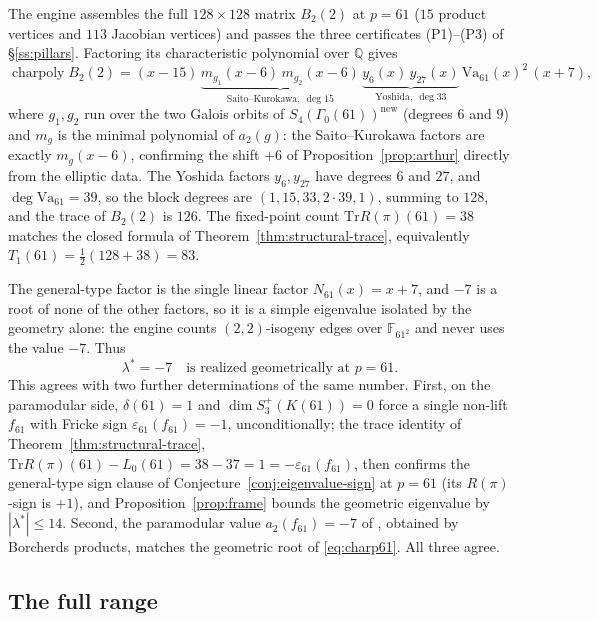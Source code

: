 \documentclass[10pt,a4paper]{amsart}
\newcommand{\Q}{\mathbb{Q}}
\newcommand{\F}{\mathbb{F}}
\newcommand{\Tr}{\mathrm{Tr}}
\newcommand{\Va}{\mathrm{Va}}
\newcommand{\eps}{\varepsilon}
\DeclareMathOperator{\charp}{charpoly}
\providecommand{\Va}{\mathrm{Va}}
\providecommand{\charp}{\operatorname{charpoly}}
\begin{document}
	The engine assembles the full $128\times128$ matrix $B_2(2)$ at $p=61$
	($15$ product vertices and $113$ Jacobian vertices) and passes the three
	certificates (P1)--(P3) of \S\ref{ss:pillars}. Factoring its
	characteristic polynomial over $\Q$ gives
	\begin{equation}\label{eq:charp61}
		\charp B_2(2)
		=(x-15)\,
		\underbrace{m_{g_1}\!(x{-}6)\,m_{g_2}\!(x{-}6)}_{\text{Saito--Kurokawa},\
			\deg 15}\,
		\underbrace{y_6(x)\,y_{27}(x)}_{\text{Yoshida},\ \deg 33}\,
		\Va_{61}(x)^2\,(x+7),
	\end{equation}
	where $g_1,g_2$ run over the two Galois orbits of
	$S_4(\Gamma_0(61))^{\mathrm{new}}$ (degrees $6$ and $9$) and $m_g$ is the
	minimal polynomial of $a_2(g)$: the Saito--Kurokawa factors are exactly
	$m_g(x-6)$, confirming the shift $+6$ of
	Proposition~\ref{prop:arthur} directly from the elliptic data. The Yoshida
	factors $y_6,y_{27}$ have degrees $6$ and $27$, and $\deg\Va_{61}=39$, so
	the block degrees are $(1,15,33,2\cdot39,1)$, summing to $128$, and the
	trace of $B_2(2)$ is $126$. The fixed-point count $\Tr R(\pi)(61)=38$ matches the
	closed formula of Theorem~\ref{thm:structural-trace}, equivalently
	$T_1(61)=\tfrac12(128+38)=83$.
	
	The general-type factor is the single linear factor $N_{61}(x)=x+7$, and
	$-7$ is a root of none of the other factors, so it is a simple eigenvalue
	isolated by the geometry alone: the engine counts $(2,2)$-isogeny edges
	over $\F_{61^2}$ and never uses the value $-7$. Thus
	\begin{equation}\label{eq:lambda61}
		\lambda^\ast=-7\quad\text{is realized geometrically at }p=61.
	\end{equation}
	This agrees with two further determinations of the same number. First, on
	the paramodular side, $\delta(61)=1$ and $\dim S_3^+(K(61))=0$
	\cite[Cor.~5.3]{Ibukiyama2019quinary} force a single non-lift $f_{61}$
	with Fricke sign $\eps_{61}(f_{61})=-1$, unconditionally; the trace
	identity of Theorem~\ref{thm:structural-trace},
	$\Tr R(\pi)(61)-L_0(61)=38-37=1=-\eps_{61}(f_{61})$, then confirms the
	general-type sign clause of Conjecture~\ref{conj:eigenvalue-sign} at
	$p=61$ (its $R(\pi)$-sign is $+1$), and Proposition~\ref{prop:frame}
	bounds the geometric eigenvalue by $|\lambda^\ast|\le14$. Second, the
	paramodular value $a_2(f_{61})=-7$ of \cite{PoorYuen2015}, obtained by
	Borcherds products, matches the geometric root of \eqref{eq:charp61}. All
	three agree.
	
	\subsection{The full range}
	\label{ss:full-range}
	
\end{document}
